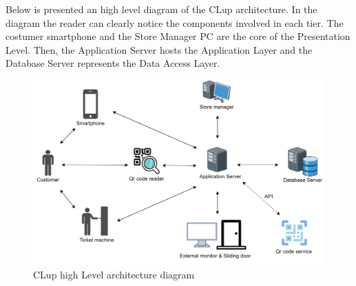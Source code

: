 \documentclass[]{article}
\begin{document}
\begin{paragraph}
	\newpage
	\noindent
	Below is presented an high level diagram of the CLup architecture. In the diagram the reader can clearly notice the components involved in each tier.
	The costumer smartphone and the Store Manager PC are the core of the Presentation Level. Then, the Application Server hosts the Application Layer and the Database Server represents the Data Access Layer.
	\bigskip
	\bigskip
	\begin{figure}[H]
		\centering
		\includegraphics[scale=0.8]{HighLevelDiagram}
		\caption{CLup high Level architecture diagram}
	\end{figure}


\newpage
				
				\end {paragraph}
				
\end{document}

